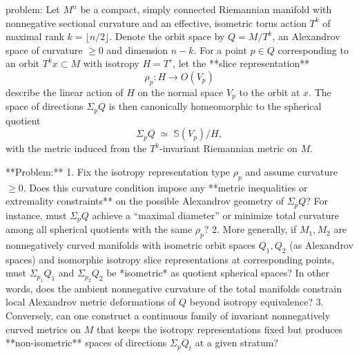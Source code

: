 problem:  
Let \( M^{n} \) be a compact, simply connected Riemannian manifold with nonnegative sectional curvature and an effective, isometric torus action \(T^{k}\) of maximal rank \(k = \lfloor n/2 \rfloor\).  Denote the orbit space by \(Q = M/T^{k}\), an Alexandrov space of curvature \(\ge 0\) and dimension \(n - k\).  For a point \(p \in Q\) corresponding to an orbit \(T^{k}x \subset M\) with isotropy \(H = T^{r}\), let the **slice representation**
\[
\rho_p: H \to O(V_p)
\]
describe the linear action of \(H\) on the normal space \(V_p\) to the orbit at \(x\).  The space of directions \(\Sigma_p Q\) is then canonically homeomorphic to the spherical quotient
\[
\Sigma_p Q \;\simeq\; \mathbb{S}(V_p)/H,
\]
with the metric induced from the \(T^k\)-invariant Riemannian metric on \(M\).

**Problem:**  
1. Fix the isotropy representation type \(\rho_p\) and assume curvature \(\ge 0\).  Does this curvature condition impose any **metric inequalities or extremality constraints** on the possible Alexandrov geometry of \(\Sigma_p Q\)?  For instance, must \(\Sigma_p Q\) achieve a “maximal diameter” or minimize total curvature among all spherical quotients with the same \(\rho_p\)?  
2. More generally, if \(M_1, M_2\) are nonnegatively curved manifolds with isometric orbit spaces \(Q_1, Q_2\) (as Alexandrov spaces) and isomorphic isotropy slice representations at corresponding points, must \(\Sigma_{p_1} Q_1\) and \(\Sigma_{p_2} Q_2\) be *isometric* as quotient spherical spaces? In other words, does the ambient nonnegative curvature of the total manifolds constrain local Alexandrov metric deformations of \(Q\) beyond isotropy equivalence?  
3. Conversely, can one construct a continuous family of invariant nonnegatively curved metrics on \(M\) that keeps the isotropy representations fixed but produces **non-isometric** spaces of directions \(\Sigma_p Q_t\) at a given stratum?  

